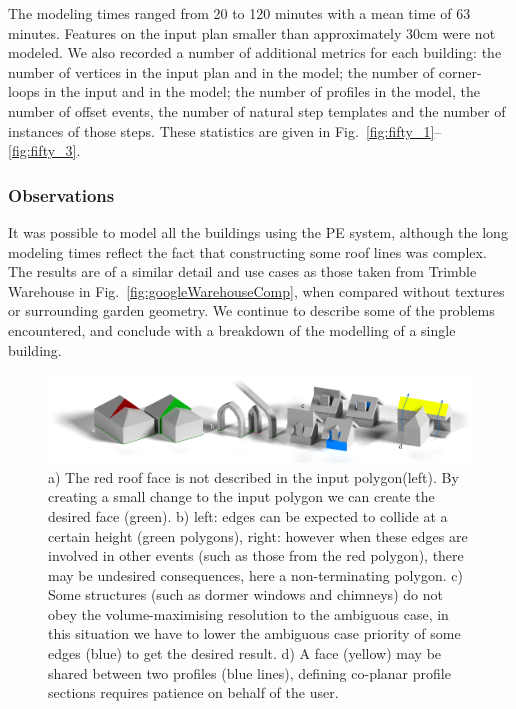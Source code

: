 The modeling times ranged from 20 to 120 minutes with a mean time of 63 minutes. Features on the input plan smaller than approximately 30cm were not modeled. We also recorded a number of additional metrics for each building: the number of vertices in the input plan and in the model; the number of corner-loops in the input and in the model; the number of profiles in the model, the number of offset events, the number of natural step templates and the number of instances of those steps. These statistics are given in Fig.~\ref{fig:fifty_1}--\ref{fig:fifty_3}.



\subsubsection{Observations}

It was possible to model all the buildings using the PE system, although the long modeling times reflect the fact that constructing some roof lines was complex. The results are of a similar detail and use cases as those taken from Trimble Warehouse in Fig.~\ref{fig:googleWarehouseComp}, when compared without textures or surrounding garden geometry. We continue to describe some of the problems encountered, and conclude with a breakdown of the modelling of a single building.



\begin{figure}
  \centering
  \includegraphics[width=1.0\columnwidth]{problem_cases.png}
  \caption[Usability issues with PEs]{\label{fig:problems}a) The red roof face is not described in the input polygon(left). By creating a small change to the input polygon we can create the desired face (green). b) left: edges can be expected to collide at a certain height (green polygons), right: however when these edges are involved in other events (such as those from the red polygon), there may be undesired consequences, here a non-terminating polygon. c) Some structures (such as dormer windows and chimneys) do not obey the volume-maximising resolution to the ambiguous case, in this situation we have to lower the ambiguous case priority of some edges (blue) to get the desired result. d) A face (yellow) may be shared between two profiles (blue lines), defining co-planar profile sections requires patience on behalf of the user.}
\end{figure}

